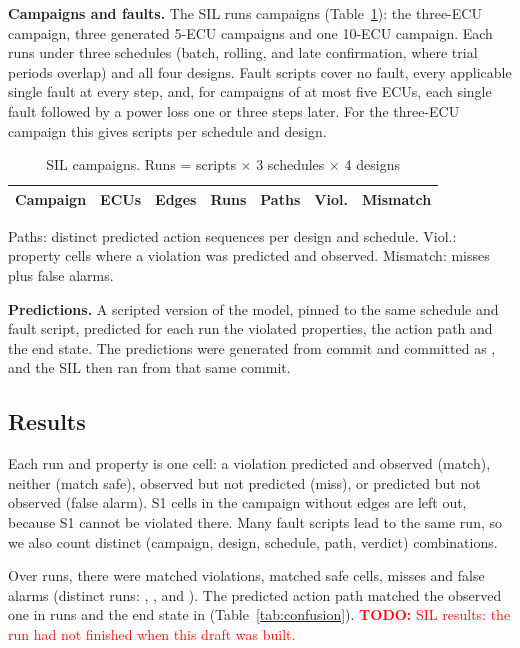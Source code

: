 \documentclass[journal]{IEEEtran}
\newcommand{\todo}[1]{\textcolor{red}{\textbf{TODO:} #1}}
\begin{document}
\textbf{Campaigns and faults.} The SIL runs \SilCampaigns{} campaigns (Table~\ref{tab:silcamp}): the three-ECU campaign, three generated 5-ECU campaigns and one 10-ECU campaign. Each runs under three schedules (batch, rolling, and late confirmation, where trial periods overlap) and all four designs. Fault scripts cover no fault, every applicable single fault at every step, and, for campaigns of at most five ECUs, each single fault followed by a power loss one or three steps later. For the three-ECU campaign this gives \SilScriptsSmall{} scripts per schedule and design.

\begin{table}[t]
\caption{SIL campaigns. Runs = scripts $\times$ 3 schedules $\times$ 4 designs}
\label{tab:silcamp}
\centering
\footnotesize
\setlength{\tabcolsep}{2.5pt}
\begin{tabular}{@{}lrrrrrr@{}}
\toprule
Campaign & ECUs & Edges & Runs & Paths & Viol. & Mismatch \\
\midrule

\end{tabular}

\smallskip
\raggedright\scriptsize Paths: distinct predicted action sequences per design and schedule. Viol.: property cells where a violation was predicted and observed. Mismatch: misses plus false alarms.
\end{table}

\textbf{Predictions.} A scripted version of the model, pinned to the same schedule and fault script, predicted for each run the violated properties, the action path and the end state. \ifsil The predictions were generated from commit \texttt{\PredictCommit} and committed as \texttt{\SilCommit}, and the SIL then ran from that same commit. \fi

\subsection{Results}
\ifsil
Each run and property is one cell: a violation predicted and observed (match), neither (match safe), observed but not predicted (miss), or predicted but not observed (false alarm). S1 cells in the campaign without edges are left out, because S1 cannot be violated there. Many fault scripts lead to the same run, so we also count distinct (campaign, design, schedule, path, verdict) combinations.

Over \SilRuns{} runs, there were \SilAllMatchViol{} matched violations, \SilAllMatchSafe{} matched safe cells, \SilAllMiss{} misses and \SilAllFalseAlarm{} false alarms (distinct runs: \SilDistinctMatchViol, \SilDistinctMatchSafe, \SilDistinctMiss{} and \SilDistinctFalseAlarm). The predicted action path matched the observed one in \SilSamePath{} runs and the end state in \SilSameEnd{} (Table~\ref{tab:confusion}).
\else
\todo{SIL results: the run had not finished when this draft was built.}
\fi
\end{document}
